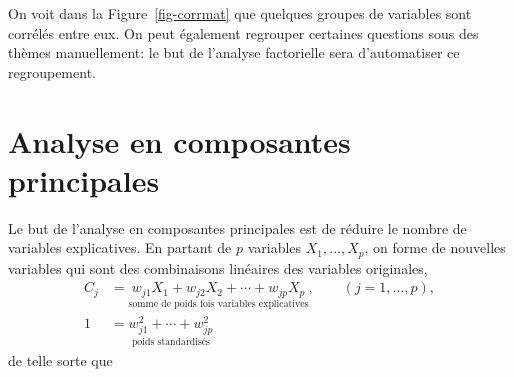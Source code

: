 \documentclass[
  11pt,
  letterpaper,
]{scrbook}
\theoremstyle{definition}
\theoremstyle{remark}
\begin{document}
\begin{table}

\caption{\label{tbl-statdescriptfactorpdf}Statistiques descriptives des
12 variables du jeu de données factor.}


\end{table}%

On voit dans la Figure~\ref{fig-corrmat} que quelques groupes de
variables sont corrélés entre eux. On peut également regrouper certaines
questions sous des thèmes manuellement: le but de l'analyse factorielle
sera d'automatiser ce regroupement.

\section{Analyse en composantes
principales}\label{analyse-en-composantes-principales}

Le but de l'analyse en composantes principales est de réduire le nombre
de variables explicatives. En partant de \(p\) variables
\(X_1, \ldots, X_p\), on forme de nouvelles variables qui sont des
combinaisons linéaires des variables originales, \begin{align*}
C_j &= \underset{\text{somme de poids fois variables explicatives}}{w_{j1} X_1 + w_{j2} X_2 + \cdots + w_{jp} X_p}, \qquad (j=1, \ldots, p),
\\
1 &= \underset{\text{poids standardisés}}{w_{j1}^2 + \cdots + w_{jp}^2}
\end{align*} de telle sorte que
\end{document}
